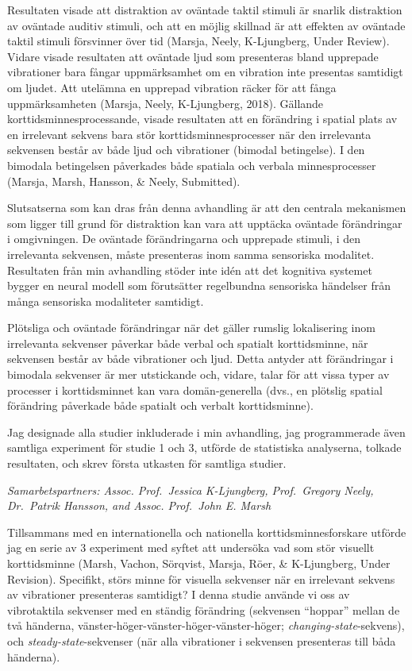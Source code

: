 \documentclass[]{article}
\begin{document}
Resultaten visade att distraktion av oväntade taktil stimuli är snarlik
distraktion av oväntade auditiv stimuli, och att en möjlig skillnad är
att effekten av oväntade taktil stimuli försvinner över tid (Marsja,
Neely, K-Ljungberg, Under Review). Vidare visade resultaten att oväntade
ljud som presenteras bland upprepade vibrationer bara fångar
uppmärksamhet om en vibration inte presentas samtidigt om ljudet. Att
utelämna en upprepad vibration räcker för att fånga uppmärksamheten
(Marsja, Neely, K-Ljungberg, 2018). Gällande korttidsminnesprocessande,
visade resultaten att en förändring i spatial plats av en irrelevant
sekvens bara stör korttidsminnesprocesser när den irrelevanta sekvensen
består av både ljud och vibrationer (bimodal betingelse). I den bimodala
betingelsen påverkades både spatiala och verbala minnesprocesser
(Marsja, Marsh, Hansson, \& Neely, Submitted).

Slutsatserna som kan dras från denna avhandling är att den centrala
mekanismen som ligger till grund för distraktion kan vara att upptäcka
oväntade förändringar i omgivningen. De oväntade förändringarna och
upprepade stimuli, i den irrelevanta sekvensen, måste presenteras inom
samma sensoriska modalitet. Resultaten från min avhandling stöder inte
idén att det kognitiva systemet bygger en neural modell som förutsätter
regelbundna sensoriska händelser från många sensoriska modaliteter
samtidigt.

Plötsliga och oväntade förändringar när det gäller rumslig lokalisering
inom irrelevanta sekvenser påverkar både verbal och spatialt
korttidsminne, när sekvensen består av både vibrationer och ljud. Detta
antyder att förändringar i bimodala sekvenser är mer utstickande och,
vidare, talar för att vissa typer av processer i korttidsminnet kan vara
domän-generella (dvs., en plötslig spatial förändring påverkade både
spatialt och verbalt korttidsminne).

Jag designade alla studier inkluderade i min avhandling, jag
programmerade även samtliga experiment för studie 1 och 3, utförde de
statistiska analyserna, tolkade resultaten, och skrev första utkasten
för samtliga studier.

\emph{Samarbetspartners: Assoc. Prof.~Jessica K-Ljungberg, Prof.~Gregory
Neely, Dr.~Patrik Hansson, and Assoc. Prof.~John E. Marsh}

Tillsammans med en internationella och nationella korttidsminnesforskare
utförde jag en serie av 3 experiment med syftet att undersöka vad som
stör visuellt korttidsminne (Marsh, Vachon, Sörqvist, Marsja, Röer, \&
K-Ljungberg, Under Revision). Specifikt, störs minne för visuella
sekvenser när en irrelevant sekvens av vibrationer presenteras
samtidigt? I denna studie använde vi oss av vibrotaktila sekvenser med
en ständig förändring (sekvensen ``hoppar'' mellan de två händerna,
vänster-höger-vänster-höger-vänster-höger;
\emph{changing-state}-sekvens), och \emph{steady-state}-sekvenser (när
alla vibrationer i sekvensen presenteras till båda händerna).
\end{document}
